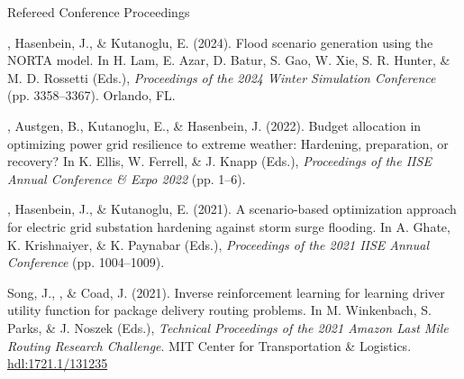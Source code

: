 \begin{rSection}{Refereed Conference Proceedings}
\begin{pubs}
    \item \me, Hasenbein, J., \& Kutanoglu, E. (2024). Flood scenario generation using the NORTA model. In H. Lam, E. Azar, D. Batur, S. Gao, W. Xie, S. R. Hunter, \& M. D. Rossetti (Eds.), \textit{Proceedings of the 2024 Winter Simulation Conference} (pp. 3358--3367). Orlando, FL.

    \item \me, Austgen, B., Kutanoglu, E., \& Hasenbein, J. (2022). Budget allocation in optimizing power grid resilience to extreme weather: Hardening, preparation, or recovery? In K. Ellis, W. Ferrell, \& J. Knapp (Eds.), \textit{Proceedings of the IISE Annual Conference \& Expo 2022} (pp. 1--6). 

    \item \me, Hasenbein, J., \& Kutanoglu, E. (2021). A scenario-based optimization approach for electric grid substation hardening against storm surge flooding. In A. Ghate, K. Krishnaiyer, \& K. Paynabar (Eds.), \textit{Proceedings of the 2021 IISE Annual Conference} (pp. 1004--1009).

    \item Song, J., \me, \& Coad, J. (2021). Inverse reinforcement learning for learning driver utility function for package delivery routing problems. In M. Winkenbach, S. Parks, \& J. Noszek (Eds.), \textit{Technical Proceedings of the 2021 Amazon Last Mile Routing Research Challenge}. MIT Center for Transportation \& Logistics. \href{https://hdl.handle.net/1721.1/131235}{hdl:1721.1/131235}
\end{pubs}
\end{rSection}
